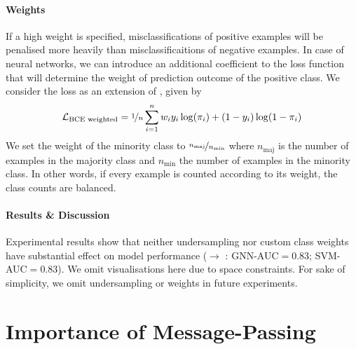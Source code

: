 \documentclass[
	fontsize=10pt, %
	twoside=false, %
	secnumdepth=1, %
  toc=indentunnumbered %
]{kaobook}
\begin{document}
\paragraph{Weights} 
If a high weight is specified, misclassifications of positive
examples will be penalised more heavily than misclassificaitions of negative examples.
In case of neural networks, we can introduce an additional coefficient to the
loss function that will determine the weight of prediction outcome of the
positive class. 
%
We consider the  loss as
an extension of , given by
\begin{align}
  \label{eq:bce-loss-weighted}
  \mathcal{L}_{\text{BCE weighted}} = \nicefrac{1}{n} \sum_{i=1}^n w_i y_i \log(\pi_i) + (1-y_i) \log (1-\pi_i)
\end{align}
We set the weight of the minority class to
$\nicefrac{n_{\text{maj}}}{n_{\text{min}}}$ where $n_{\text{maj}}$ is the number
of examples in the majority
class and $n_{\text{min}}$ the number of examples in the minority class. In
other words, if every example is counted according to its weight, the class
counts are balanced.

\paragraph{Results \& Discussion} Experimental results show that neither
undersampling nor custom class weights have substantial effect on model
performance (\ADLast $\rightarrow$ \PDMap: GNN-AUC$=0.83$; SVM-AUC$=0.83$). We
omit visualisations here due to space constraints.
For sake of simplicity, we omit undersampling or weights in future experiments.



\section{Importance of Message-Passing}
\end{document}
